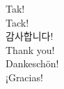 \documentclass[
  9pt
  , table
  , ignorenonframetext
]{beamer}
\begin{document}
\begin{frame}[plain]
  \begin{center}
    {\LARGE Tak!}  \\\vspace{6mm}
    {\LARGE Tack!}  \\\vspace{6mm}
    {\LARGE 감사합니다!}\\\vspace{6mm}
    {\LARGE Thank you!}  \\\vspace{6mm}
    {\LARGE Dankesch\"on!} \\\vspace{6mm}
    {\LARGE ¡Gracias!}\\\vspace{6mm}
    {\LARGE \smiley } 
  \end{center}
  
\end{frame}
\end{document}
